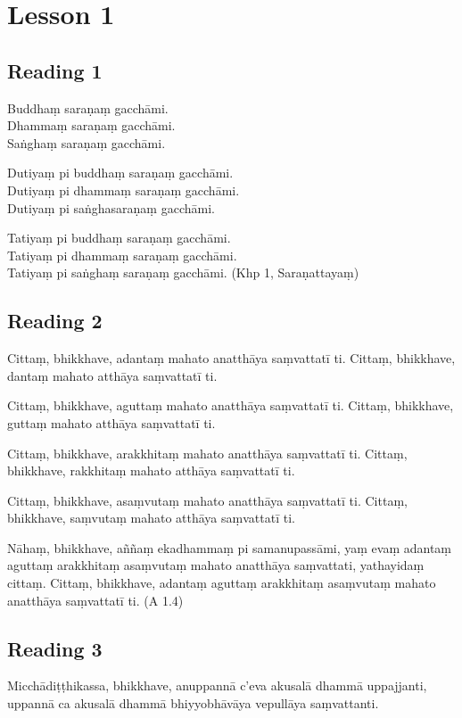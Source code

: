 \chapter{Lesson 1}

\section*{Reading 1}

Buddhaṃ saraṇaṃ gacchāmi.\\
Dhammaṃ saraṇaṃ gacchāmi.\\
Saṅghaṃ saraṇaṃ gacchāmi.

Dutiyaṃ pi buddhaṃ saraṇaṃ gacchāmi.\\
Dutiyaṃ pi dhammaṃ saraṇaṃ gacchāmi.\\
Dutiyaṃ pi saṅghasaraṇaṃ gacchāmi.

Tatiyaṃ pi buddhaṃ saraṇaṃ gacchāmi.\\
Tatiyaṃ pi dhammaṃ saraṇaṃ gacchāmi.\\
Tatiyaṃ pi saṅghaṃ saraṇaṃ gacchāmi. \hfill(Khp 1, Saraṇattayaṃ)

\section*{Reading 2}

Cittaṃ, bhikkhave, adantaṃ mahato anatthāya saṃvattatī ti. Cittaṃ, bhikkhave, dantaṃ mahato atthāya saṃvattatī ti.

Cittaṃ, bhikkhave, aguttaṃ mahato anatthāya saṃvattatī ti. Cittaṃ, bhikkhave, guttaṃ mahato atthāya saṃvattatī ti.

Cittaṃ, bhikkhave, arakkhitaṃ mahato anatthāya saṃvattatī ti. Cittaṃ, bhikkhave, rakkhitaṃ mahato atthāya saṃvattatī ti.

Cittaṃ, bhikkhave, asaṃvutaṃ mahato anatthāya saṃvattatī ti. Cittaṃ, bhikkhave, saṃvutaṃ mahato atthāya saṃvattatī ti.

Nāhaṃ, bhikkhave, aññaṃ ekadhammaṃ pi samanupassāmi, yaṃ evaṃ adantaṃ aguttaṃ arakkhitaṃ asaṃvutaṃ mahato anatthāya saṃvattati, yathayidaṃ cittaṃ. Cittaṃ, bhikkhave, adantaṃ aguttaṃ arakkhitaṃ asaṃvutaṃ mahato anatthāya saṃvattatī ti. \hfill(A 1.4)

\section*{Reading 3}

Micchādiṭṭhikassa, bhikkhave, anuppannā c’eva akusalā dhammā uppajjanti, uppannā ca akusalā dhammā bhiyyobhāvāya vepullāya saṃvattanti.


